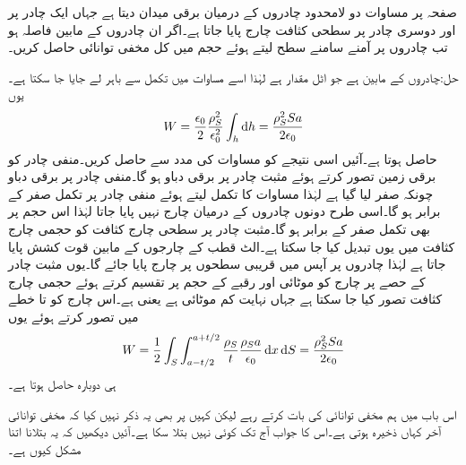 صفحہ  پر مساوات  دو لامحدود چادروں کے درمیان برقی میدان دیتا ہے جہاں ایک چادر پر  اور دوسری چادر پر  سطحی کثافت چارج پایا جاتا ہے۔اگر ان چادروں کے مابین فاصلہ  ہو تب چادروں پر آمنے سامنے  سطح لیتے ہوئے حجم    میں کل مخفی توانائی حاصل کریں۔

حل:چادروں کے مابین  ہے جو اٹل مقدار ہے  لہٰذا اسے مساوات  میں تکمل سے باہر لے جایا جا سکتا ہے۔یوں
\begin{align}\label{مساوات_توانائی_مخفی_توانائی_ذخیرہ_الف}
W=\frac{\epsilon_0}{2}\frac{\rho_S^2}{\epsilon_0^2} \int_h \dif h =\frac{\rho_S^2 S a}{2 \epsilon_0}
\end{align}
حاصل ہوتا ہے۔آئیں اسی نتیجے کو مساوات  کی مدد سے حاصل کریں۔منفی چادر کو برقی زمین تصور کرتے ہوئے مثبت چادر پر  برقی دباو ہو گا۔منفی چادر پر برقی دباو چونکہ صفر لیا گیا ہے لہٰذا مساوات  کا تکمل لیتے ہوئے منفی چادر پر تکمل صفر کے برابر ہو گا۔اسی طرح دونوں چادروں کے درمیان چارج نہیں پایا جاتا لہٰذا اس حجم  پر بھی تکمل صفر کے برابر ہو گا۔مثبت چادر پر سطحی چارج کثافت کو حجمی چارج کثافت میں یوں تبدیل کیا جا سکتا ہے۔الٹ قطب کے چارجوں کے مابین قوت کشش پایا جاتا ہے لہٰذا چادروں پر آپس میں قریبی سطحوں پر چارج پایا جائے گا۔یوں مثبت چادر  کے  حصے پر چارج  کو  موٹائی اور  رقبے کے حجم  پر تقسیم کرتے ہوئے  حجمی چارج کثافت تصور کیا جا سکتا ہے جہاں  نہایت کم موٹائی ہے یعنی  ہے۔اس چارج کو  تا  خطے میں تصور کرتے ہوئے یوں
\begin{align}\label{مساوات_توانائی_مخفی_توانائی_ذخیرہ_ب}
W=\frac{1}{2}\int_S \int_{a-t/2}^{a+t/2} \frac{\rho_S}{t} \frac{\rho_S a}{\epsilon_0} \dif x \dif S=\frac{\rho_S^2 S a}{2 \epsilon_0}
\end{align}
ہی دوبارہ حاصل ہوتا ہے۔

اس باب میں ہم مخفی توانائی کی بات کرتے رہے لیکن کہیں پر بھی یہ ذکر نہیں کیا کہ مخفی توانائی آخر کہاں  ذخیرہ ہوتی ہے۔اس کا جواب آج تک کوئی نہیں بتلا سکا ہے۔آئیں دیکھیں کہ یہ بتلانا اتنا مشکل کیوں ہے۔

